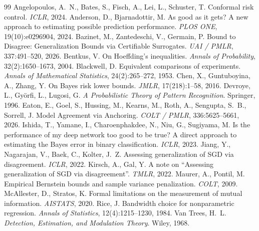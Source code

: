 \documentclass[11pt]{article}
\theoremstyle{definition}
\begin{document}

\begin{thebibliography}{99}
 Angelopoulos, A.\ N., Bates, S., Fisch, A., Lei, L., Schuster, T. Conformal risk control. \emph{ICLR}, 2024.
 Anderson, D., Bjarnadottir, M. As good as it gets? A new approach to estimating possible prediction performance. \emph{PLOS ONE}, 19(10):e0296904, 2024.
 Bazinet, M., Zantedeschi, V., Germain, P. Bound to Disagree: Generalization Bounds via Certifiable Surrogates. \emph{UAI / PMLR}, 337:491--520, 2026.
 Bentkus, V. On Hoeffding's inequalities. \emph{Annals of Probability}, 32(2):1650--1673, 2004.
 Blackwell, D. Equivalent comparisons of experiments. \emph{Annals of Mathematical Statistics}, 24(2):265--272, 1953.
 Chen, X., Guntuboyina, A., Zhang, Y. On Bayes risk lower bounds. \emph{JMLR}, 17(218):1--58, 2016.
 Devroye, L., Gy\"orfi, L., Lugosi, G. \emph{A Probabilistic Theory of Pattern Recognition}. Springer, 1996.
 Eaton, E., Goel, S., Hussing, M., Kearns, M., Roth, A., Sengupta, S.\ B., Sorrell, J. Model Agreement via Anchoring. \emph{COLT / PMLR}, 336:5625--5661, 2026.
 Ishida, T., Yamane, I., Charoenphakdee, N., Niu, G., Sugiyama, M. Is the performance of my deep network too good to be true? A direct approach to estimating the Bayes error in binary classification. \emph{ICLR}, 2023.
 Jiang, Y., Nagarajan, V., Baek, C., Kolter, J.\ Z. Assessing generalization of SGD via disagreement. \emph{ICLR}, 2022.
 Kirsch, A., Gal, Y. A note on ``Assessing generalization of SGD via disagreement''. \emph{TMLR}, 2022.
 Maurer, A., Pontil, M. Empirical Bernstein bounds and sample variance penalization. \emph{COLT}, 2009.
 McAllester, D., Stratos, K. Formal limitations on the measurement of mutual information. \emph{AISTATS}, 2020.
 Rice, J. Bandwidth choice for nonparametric regression. \emph{Annals of Statistics}, 12(4):1215--1230, 1984.
 Van Trees, H.\ L. \emph{Detection, Estimation, and Modulation Theory}. Wiley, 1968.
\end{thebibliography}
\end{document}
